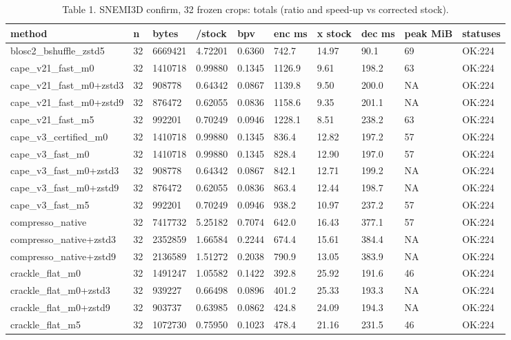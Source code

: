 \begin{table}[t]
\centering
\small
\caption{Table 1. SNEMI3D confirm, 32 frozen crops: totals (ratio and speed-up vs corrected stock).}
\begin{tabular}{llllllllll}
\hline
method & n & bytes & /stock & bpv & enc ms & x stock & dec ms & peak MiB & statuses \\
\hline
blosc2\_bshuffle\_zstd5 & 32 & 6669421 & 4.72201 & 0.6360 & 742.7 & 14.97 & 90.1 & 69 & OK:224 \\
cape\_v21\_fast\_m0 & 32 & 1410718 & 0.99880 & 0.1345 & 1126.9 & 9.61 & 198.2 & 63 & OK:224 \\
cape\_v21\_fast\_m0+zstd3 & 32 & 908778 & 0.64342 & 0.0867 & 1139.8 & 9.50 & 200.0 & NA & OK:224 \\
cape\_v21\_fast\_m0+zstd9 & 32 & 876472 & 0.62055 & 0.0836 & 1158.6 & 9.35 & 201.1 & NA & OK:224 \\
cape\_v21\_fast\_m5 & 32 & 992201 & 0.70249 & 0.0946 & 1228.1 & 8.51 & 238.2 & 63 & OK:224 \\
cape\_v3\_certified\_m0 & 32 & 1410718 & 0.99880 & 0.1345 & 836.4 & 12.82 & 197.2 & 57 & OK:224 \\
cape\_v3\_fast\_m0 & 32 & 1410718 & 0.99880 & 0.1345 & 828.4 & 12.90 & 197.0 & 57 & OK:224 \\
cape\_v3\_fast\_m0+zstd3 & 32 & 908778 & 0.64342 & 0.0867 & 842.1 & 12.71 & 199.2 & NA & OK:224 \\
cape\_v3\_fast\_m0+zstd9 & 32 & 876472 & 0.62055 & 0.0836 & 863.4 & 12.44 & 198.7 & NA & OK:224 \\
cape\_v3\_fast\_m5 & 32 & 992201 & 0.70249 & 0.0946 & 938.2 & 10.97 & 237.2 & 57 & OK:224 \\
compresso\_native & 32 & 7417732 & 5.25182 & 0.7074 & 642.0 & 16.43 & 377.1 & 57 & OK:224 \\
compresso\_native+zstd3 & 32 & 2352859 & 1.66584 & 0.2244 & 674.4 & 15.61 & 384.4 & NA & OK:224 \\
compresso\_native+zstd9 & 32 & 2136589 & 1.51272 & 0.2038 & 790.9 & 13.05 & 383.9 & NA & OK:224 \\
crackle\_flat\_m0 & 32 & 1491247 & 1.05582 & 0.1422 & 392.8 & 25.92 & 191.6 & 46 & OK:224 \\
crackle\_flat\_m0+zstd3 & 32 & 939227 & 0.66498 & 0.0896 & 401.2 & 25.33 & 193.3 & NA & OK:224 \\
crackle\_flat\_m0+zstd9 & 32 & 903737 & 0.63985 & 0.0862 & 424.8 & 24.09 & 194.3 & NA & OK:224 \\
crackle\_flat\_m5 & 32 & 1072730 & 0.75950 & 0.1023 & 478.4 & 21.16 & 231.5 & 46 & OK:224 \\

\end{tabular}
\end{table}
